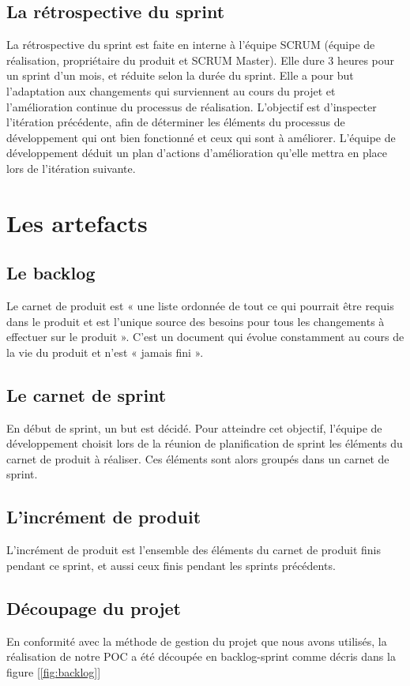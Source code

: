 \documentclass[a4paper,12pt]{book}
\theoremstyle{break}
\begin{document}
\subsection{La rétrospective du sprint}
La rétrospective du sprint est faite en interne à l'équipe SCRUM (équipe de réalisation, propriétaire du produit et SCRUM Master). Elle dure 3 heures pour un sprint d'un mois, et réduite selon la durée du sprint. Elle a pour but l'adaptation aux changements qui surviennent au cours du projet et l'amélioration continue du processus de réalisation.
L'objectif est d’inspecter l'itération précédente, afin de déterminer les éléments du processus de développement qui ont bien fonctionné et ceux qui sont à améliorer. L'équipe de développement déduit un plan d'actions d'amélioration qu'elle mettra en place lors de l'itération suivante.

\section{Les artefacts}
\subsection{Le backlog}
Le carnet de produit est « une liste ordonnée de tout ce qui pourrait être requis dans le produit et est l'unique source des besoins pour tous les changements à effectuer sur le produit ». C'est un document qui évolue constamment au cours de la vie du produit et n'est « jamais fini ».

\subsection{Le carnet de sprint} 
En début de sprint, un but est décidé. Pour atteindre cet objectif, l'équipe de développement choisit lors de la réunion de planification de sprint les éléments du carnet de produit à réaliser. Ces éléments sont alors groupés dans un carnet de sprint.

\subsection{L'incrément de produit}
L'incrément de produit est l'ensemble des éléments du carnet de produit finis pendant ce sprint, et aussi ceux finis pendant les sprints précédents. 

\subsection{Découpage du projet}
En conformité avec la méthode de gestion du projet que nous avons utilisés, la réalisation de notre POC a été découpée en backlog-sprint comme décris dans la figure [\ref{fig:backlog}] 
\end{document}
